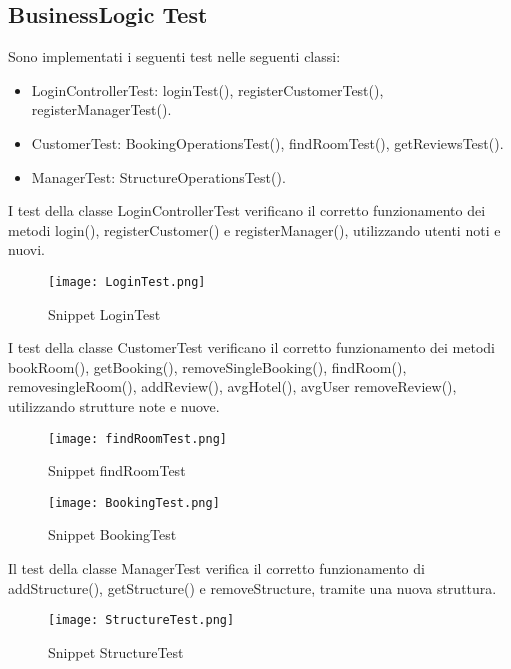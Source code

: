 \documentclass{article}
\begin{document}
\subsection{BusinessLogic Test}
Sono implementati i seguenti test nelle seguenti classi:
\begin{itemize}
    \item LoginControllerTest:\newline
    loginTest(), registerCustomerTest(), registerManagerTest().
    \item CustomerTest:\newline
    BookingOperationsTest(), findRoomTest(), getReviewsTest().
    \item ManagerTest:\newline
    StructureOperationsTest().
\end{itemize}
I test della classe LoginControllerTest verificano il corretto funzionamento dei metodi login(), registerCustomer() e registerManager(), utilizzando utenti noti e nuovi.
\begin{figure}[h!]
    \centering
    \texttt{[image: LoginTest.png]}
    \caption{Snippet LoginTest}
    \label{fig:LoginTest}
\end{figure}
\newpage
I test della classe CustomerTest verificano il corretto funzionamento dei metodi bookRoom(), getBooking(), removeSingleBooking(), findRoom(), removesingleRoom(), addReview(), avgHotel(), avgUser removeReview(), utilizzando strutture note e nuove.
\begin{figure}[h!]
    \centering
    \texttt{[image: findRoomTest.png]}
    \caption{Snippet findRoomTest}
    \label{fig:findRoomTest}
    \vspace{2mm}
    \centering
    \texttt{[image: BookingTest.png]}
    \caption{Snippet BookingTest}
    \label{fig:BookingTest}
\end{figure}
\newpage
Il test della classe ManagerTest verifica il corretto funzionamento di addStructure(), getStructure() e removeStructure, tramite una nuova struttura.
\begin{figure}[h!]
    \centering
    \texttt{[image: StructureTest.png]}
    \caption{Snippet StructureTest}
    \label{fig:StructureTest}
\end{figure}
\newline
\end{document}
